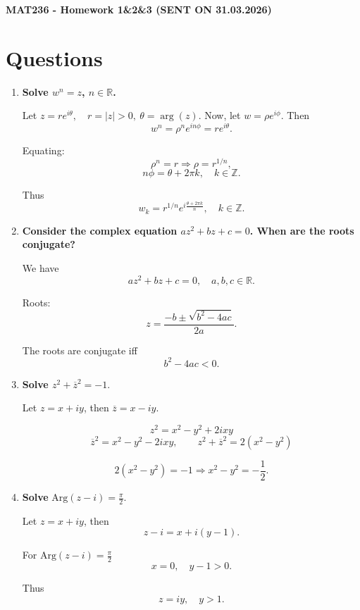 \documentclass[11pt]{article}
\begin{document}
\begin{center}
\large
\textbf{MAT236 - Homework 1\&2\&3 (SENT ON 31.03.2026)}
\end{center}

\section{Questions}

\begin{enumerate}[leftmargin=*,label=\textbf{Q\arabic*.}]
\item\textbf{Solve $w^n = z$, $n \in \mathbb{R}$.}

Let $z = r e^{i\theta}, \quad r = |z| > 0, \ \theta = \arg(z)$. Now, let $w = \rho e^{i\phi}$. Then
\[w^n = \rho^n e^{i n \phi} = r e^{i\theta}.\]

Equating:
\[
\rho^n = r \Rightarrow \rho = r^{1/n},
\]
\[
n\phi = \theta + 2\pi k, \quad k \in \mathbb{Z}.
\]

Thus
\[
\boxed{w_k = r^{1/n} e^{i \frac{\theta + 2\pi k}{n}}, \quad k \in \mathbb{Z}}.
\]

\item \textbf{Consider the complex equation $az^2 + bz + c = 0$. When are the roots conjugate?}

We have
\[
az^2 + bz + c = 0, \quad a,b,c \in \mathbb{R}.
\]

Roots:
\[
z = \frac{-b \pm \sqrt{b^2 - 4ac}}{2a}.
\]

The roots are conjugate iff
\[
\boxed{b^2 - 4ac < 0}.
\]

\item \textbf{Solve $z^2 + \overline{z}^2 = -1$}.

Let $z = x + iy$, then $\overline{z} = x - iy$.

\[
z^2 = x^2 - y^2 + 2ixy
\]
\[
\overline{z}^2 = x^2 - y^2 - 2ixy,\qquad z^2 + \overline{z}^2 = 2(x^2 - y^2)
\]

\[
2(x^2 - y^2) = -1 \Rightarrow \boxed{x^2 - y^2 = -\frac{1}{2}}.
\]

\item \textbf{Solve} $\text{Arg}(z - i) = \frac{\pi}{2}$.

Let $z = x + iy$, then
\[
z - i = x + i(y-1).
\]

For $\text{Arg}(z - i) = \frac{\pi}{2}$
\[
x = 0, \quad y - 1 > 0.
\]

Thus
\[
\boxed{z = iy, \quad y > 1}.
\]
\end{enumerate}
\end{document}
